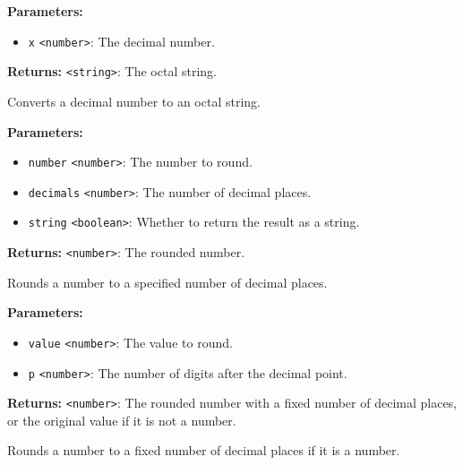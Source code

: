 \documentclass[12pt,a4paper]{article}
\begin{document}
\noindent \textbf{Parameters:}
\begin{itemize}
  \item \texttt{x} \texttt{<number>}: The decimal number.
\end{itemize}

\noindent \textbf{Returns:} \texttt{<string>}: The octal string.

\noindent Converts a decimal number to an octal string.

\vspace{5mm}
\noindent {}


\noindent \textbf{Parameters:}
\begin{itemize}
  \item \texttt{number} \texttt{<number>}: The number to round.
  \item \texttt{decimals} \texttt{<number>}: The number of decimal places.
  \item \texttt{string} \texttt{<boolean>}: Whether to return the result as a string.
\end{itemize}

\noindent \textbf{Returns:} \texttt{<number>}: The rounded number.

\noindent Rounds a number to a specified number of decimal places.

\vspace{5mm}
\noindent {}


\noindent \textbf{Parameters:}
\begin{itemize}
  \item \texttt{value} \texttt{<number>}: The value to round.
  \item \texttt{p} \texttt{<number>}: The number of digits after the decimal point.
\end{itemize}

\noindent \textbf{Returns:} \texttt{<number>}: The rounded number with a fixed number of decimal places, or the original value if it is not a number.

\noindent Rounds a number to a fixed number of decimal places if it is a number.

\vspace{5mm}
\noindent {}
\end{document}
